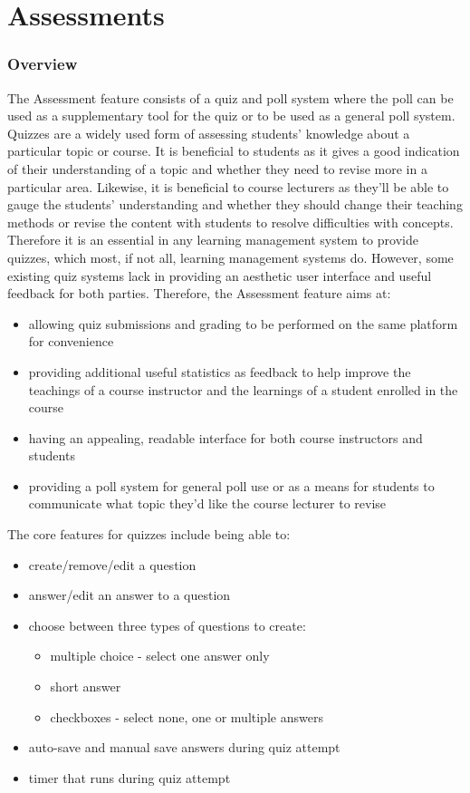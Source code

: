 \chapter{Assessments}\label{ch:assessment}

\subsection{Overview}
The Assessment feature consists of a quiz and poll system where the poll can be used as a supplementary tool for the quiz or to be used as a general poll system. Quizzes are a widely used form of assessing students' knowledge about a particular topic or course. It is beneficial to students as it gives a good indication of their understanding of a topic and whether they need to revise more in a particular area. Likewise, it is beneficial to course lecturers as they'll be able to gauge the students' understanding and whether they should change their teaching methods or revise the content with students to resolve difficulties with concepts. Therefore it is an essential in any learning management system to provide quizzes, which most, if not all, learning management systems do. However, some existing quiz systems lack in providing an aesthetic user interface and useful feedback for both parties. Therefore, the Assessment feature aims at:
\begin{itemize}
    \item allowing quiz submissions and grading to be performed on the same platform for convenience
    \item providing additional useful statistics as feedback to help improve the teachings of a course instructor and the learnings of a student enrolled in the course
    \item having an appealing, readable interface for both course instructors and students
    \item providing a poll system for general poll use or as a means for students to communicate what topic they'd like the course lecturer to revise
\end{itemize}

The core features for quizzes include being able to:
\begin{itemize}
    \item create/remove/edit a question
    \item answer/edit an answer to a question
    \item choose between three types of questions to create:
    \begin{itemize}
    	\item multiple choice - select one answer only
    	\item short answer
    	\item checkboxes - select none, one or multiple answers
    \end{itemize}
    \item auto-save and manual save answers during quiz attempt
    \item timer that runs during quiz attempt
\end{itemize}

